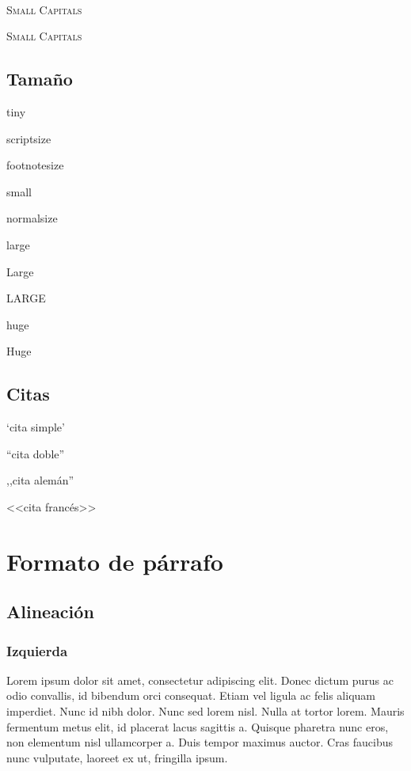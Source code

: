 \documentclass[12pt,a4paper]{article}
\begin{document}
~\\

\textsc{Small Capitals}

{\scshape Small Capitals}

\subsection{Tamaño}

{\tiny tiny}

{\scriptsize scriptsize}

{\footnotesize footnotesize}

{\small small}

{\normalsize normalsize}

{\large large}

{\Large Large}

{\LARGE LARGE}

{\huge huge}

{\Huge Huge}

\subsection{Citas}

`cita simple'

``cita doble''

,,cita alemán''

<<cita francés>>

\section{Formato de párrafo}

\subsection{Alineación}

\subsubsection{Izquierda}

\begin{flushleft}
  Lorem ipsum dolor sit amet, consectetur adipiscing elit.
  Donec dictum purus ac odio convallis, id bibendum orci consequat.
  Etiam vel ligula ac felis aliquam imperdiet. Nunc id nibh dolor.
  Nunc sed lorem nisl. Nulla at tortor lorem. Mauris fermentum metus elit,
  id placerat lacus sagittis a. Quisque pharetra nunc eros,
  non elementum nisl ullamcorper a. Duis tempor maximus auctor.
  Cras faucibus nunc vulputate, laoreet ex ut, fringilla ipsum.
\end{flushleft}
\end{document}
